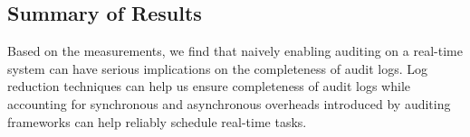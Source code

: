 \subsection{Summary of Results}
Based on the measurements, we find that naively enabling auditing on a real-time system can have serious implications on the completeness of audit logs. Log reduction techniques can help us ensure completeness of audit logs while accounting for synchronous and asynchronous overheads introduced by auditing frameworks can help reliably schedule real-time tasks. %